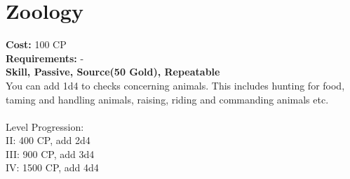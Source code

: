 \section{Zoology}
\textbf{Cost:} 100 CP\\
\textbf{Requirements:} -\\
\textbf{Skill, Passive, Source(50 Gold), Repeatable}\\
You can add 1d4 to checks concerning animals. This includes hunting for food, taming and handling animals, raising, riding and commanding animals etc.\\
\\
Level Progression:\\
II: 400 CP, add 2d4\\
III: 900 CP, add 3d4\\
IV: 1500 CP, add 4d4\\
